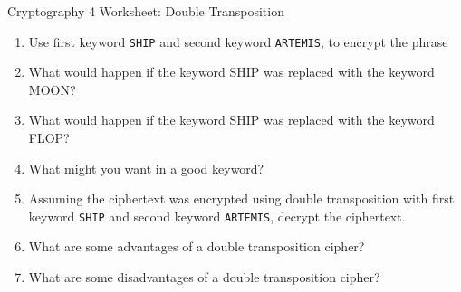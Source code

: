 \documentclass[12pt]{article}
\newcommand{\be}{\begin{enumerate}}
\newcommand{\ee}{\end{enumerate}}
\begin{document}
\begin{center}
{\Large  Cryptography 4 Worksheet: Double Transposition}
\end{center}
%
%
%


\be
\item Use first keyword {\tt SHIP} and second keyword {\tt ARTEMIS}, to encrypt the phrase 

%

\vfill

\vfill

\vfill

\item What would happen if the keyword SHIP was replaced with the keyword MOON?
\vfill
\item What would happen if the keyword SHIP was replaced with the keyword FLOP?
\vfill
\item What might you want in a good keyword?
\vfill
\newpage
\item 
Assuming the ciphertext was encrypted using double transposition with first keyword {\tt SHIP} and second keyword {\tt ARTEMIS}, decrypt the ciphertext.



\vfill

\vfill

\vfill

\vfill

\item What are some advantages of a double transposition cipher?

\vfill

\item What are some disadvantages of a double transposition cipher?

\vfill
\ee
\end{document}
